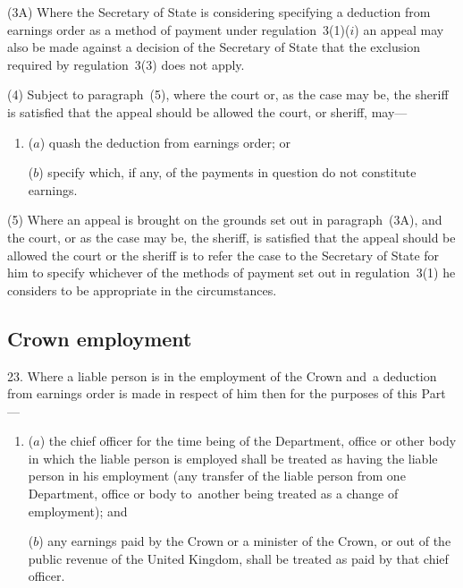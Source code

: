 \documentclass[12pt,a4paper]{article}
\begin{document}
(3A) Where the Secretary of State is considering specifying a deduction from earnings order as a method of payment under regulation~3(1)($i$)  an appeal may also be made against a decision of the Secretary of State that the exclusion required by regulation~3(3) does not apply.

(4) 
Subject to paragraph~(5),  %
where the court or, as the case may be, the sheriff is satisfied that the appeal should be allowed the court, or sheriff, may—
\begin{enumerate}\item[]
($a$) quash the deduction from earnings order; or

($b$) specify which, if any, of the payments in question do not constitute earnings.\end{enumerate}

(5) Where an appeal is brought on the grounds set out in paragraph~(3A), and the court, or as the case may be, the sheriff, is satisfied that the appeal should be allowed the court or the sheriff is to refer the case to the Secretary of State for him to specify whichever of the methods of payment set out in regulation~3(1) he considers to be appropriate in the circumstances.


\subsection[23. Crown employment]{Crown employment}

23.  Where a liable person is in the employment of the Crown and~a deduction from earnings order is made in respect of him then for the purposes of this Part—
\begin{enumerate}\item[]
($a$) the chief officer for the time being of the Department, office or other body in which the liable person is employed shall be treated as having the liable person in his employment (any transfer of the liable person from one Department, office or body to~another being treated as a change of employment); and

($b$) any earnings paid by the Crown or a minister of the Crown, or out of the public revenue of the United Kingdom, shall be treated as paid by that chief officer.
\end{enumerate}
\end{document}
